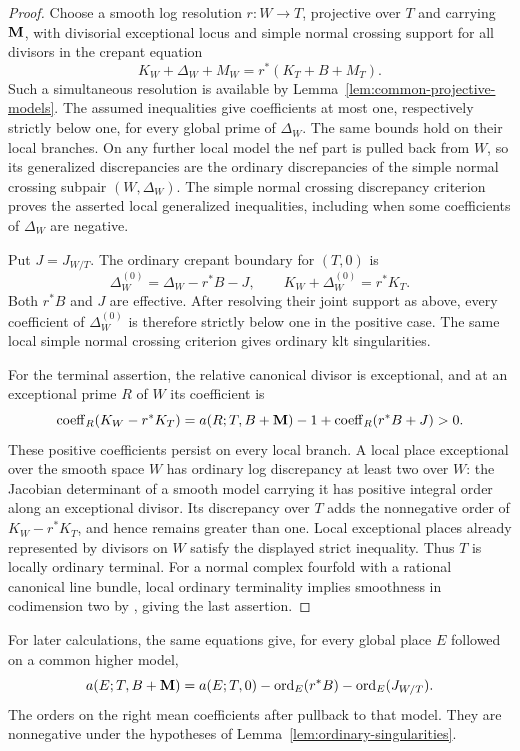 \begin{proof}
Choose a smooth log resolution $r:W\to T$, projective over $T$ and carrying $\mathbf{M}$,
with divisorial exceptional locus and simple normal crossing support
for all divisors in the crepant equation
\[
 K_W+\Delta_W+M_W=r^*(K_T+B+M_T).
\]
Such a simultaneous resolution is available by
Lemma~\ref{lem:common-projective-models}.  The assumed inequalities
give coefficients at most one, respectively strictly below one, for
every global prime of $\Delta_W$.  The same bounds hold on their local
branches.  On any further local model the nef part is pulled back from
$W$, so its generalized discrepancies are the ordinary discrepancies
of the simple normal crossing subpair $(W,\Delta_W)$.  The simple
normal crossing discrepancy criterion proves the asserted local
generalized inequalities, including when some coefficients of
$\Delta_W$ are negative.

Put $J=J_{W/T}$.  The ordinary crepant boundary for $(T,0)$ is
\begin{equation}\label{eq:ordinary-crepant-boundary}
 \Delta_W^{(0)}=\Delta_W-r^*B-J,
 \qquad K_W+\Delta_W^{(0)}=r^*K_T.
\end{equation}
Both $r^*B$ and $J$ are effective.  After resolving their joint support
as above, every coefficient of $\Delta_W^{(0)}$ is therefore strictly
below one in the positive case.  The same local simple normal crossing
criterion gives ordinary klt singularities.

For the terminal assertion, the relative canonical divisor is
exceptional, and at an exceptional prime $R$ of $W$ its coefficient is
\[
 \operatorname{coeff}_R(K_W-r^*K_T)
 =a(R;T,B+\mathbf{M})-1+\operatorname{coeff}_R(r^*B+J)>0.
\]
These positive coefficients persist on every local branch.  A local
place exceptional over the smooth space $W$ has ordinary log
discrepancy at least two over $W$: the Jacobian determinant of a smooth
model carrying it has positive integral order along an exceptional
divisor.  Its discrepancy over $T$ adds the nonnegative order of
$K_W-r^*K_T$, and hence remains greater than one.  Local exceptional
places already represented by divisors on $W$ satisfy the displayed
strict inequality.  Thus $T$ is locally ordinary terminal.
For a normal complex fourfold with a rational canonical line bundle,
local ordinary terminality implies smoothness in codimension two by
\cite[Lemma~2.3]{CanonicalKahler}, giving the last assertion.
\end{proof}

For later calculations, the same equations give, for every global place
$E$ followed on a common higher model,
\begin{equation}\label{eq:generalized-ordinary-discrepancy}
 a(E;T,B+\mathbf{M})
 =a(E;T,0)-\operatorname{ord}_E(r^*B)-\operatorname{ord}_E(J_{W/T}).
\end{equation}
The orders on the right mean coefficients after pullback to that model.
They are nonnegative under the hypotheses of
Lemma~\ref{lem:ordinary-singularities}.

